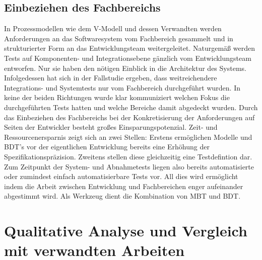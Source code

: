 \subsection{Einbeziehen des Fachbereichs}
In Prozessmodellen wie dem V-Modell und dessen Verwandten \cite{hohn_v-modell_2008} werden Anforderungen an das Softwaresystem vom Fachbereich gesammelt und in strukturierter Form an das Entwicklungsteam weitergeleitet. Naturgemäß werden Tests auf Komponenten- und Integrationsebene gänzlich vom Entwicklungsteam entworfen. Nur sie haben den nötigen Einblick in die Architektur des Systems. Infolgedessen hat sich in der Fallstudie ergeben, dass weitreichendere Integrations- und Systemtests nur vom Fachbereich durchgeführt wurden. In keine der beiden Richtungen wurde klar kommuniziert welchen Fokus die durchgeführten Tests hatten und welche Bereiche damit abgedeckt wurden. Durch das Einbeziehen des Fachbereichs bei der Konkretisierung der Anforderungen auf Seiten der Entwickler besteht großes Einsparungspotenzial. Zeit- und Ressourcenersparnis zeigt sich an zwei Stellen: Erstens ermöglichen Modelle und \Gls{BDT}'s vor der eigentlichen Entwicklung bereits eine Erhöhung der Spezifikationspräzision. Zweitens stellen diese gleichzeitig eine Testdefintion dar. Zum Zeitpunkt der System- und Abnahmetests liegen also bereits automatisierte oder zumindest einfach automatisierbare Tests vor. All dies wird ermöglicht indem die Arbeit zwischen Entwicklung und Fachbereichen enger aufeinander abgestimmt wird. Als Werkzeug dient die Kombination von \Gls{MBT} und \Gls{BDT}.

\section{Qualitative Analyse und Vergleich mit verwandten Arbeiten}

